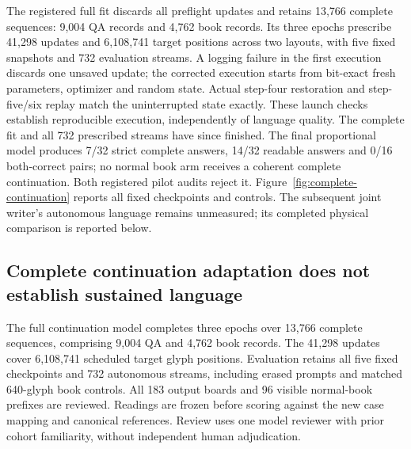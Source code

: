 \documentclass[12pt,a4paper]{article}
\providecommand{\DIFadd}[1]{{\protect\color{blue} \sf #1}} %
\begin{document}
\DIFadd{The registered full fit discards all preflight updates and retains 13,766
complete sequences: 9,004 QA records and 4,762 book records. Its three epochs
prescribe 41,298 updates and 6,108,741 target positions across two layouts,
with five fixed snapshots and 732 evaluation streams. A logging failure in
the first execution discards one unsaved update; the corrected execution starts
from bit-exact fresh parameters, optimizer and random state. Actual step-four
restoration and step-five/six replay match the uninterrupted state exactly.
These launch checks establish reproducible execution, independently of language
quality. The complete fit and all 732 prescribed streams have since finished.
The final proportional model produces 7/32 strict complete answers, 14/32
readable answers and 0/16 both-correct pairs; no normal book arm receives a
coherent complete continuation. Both registered pilot audits reject it.
Figure~\ref{fig:complete-continuation} reports all fixed checkpoints and controls.
The subsequent joint writer's autonomous language remains unmeasured; its
completed physical comparison is reported below.
}


\subsection*{\DIFadd{Complete continuation adaptation does not establish sustained language}}
\DIFadd{The full continuation model completes three epochs over 13,766 complete
sequences, comprising 9,004 QA and 4,762 book records. The 41,298 updates cover
6,108,741 scheduled target glyph positions. Evaluation retains all five fixed
checkpoints and 732 autonomous streams, including erased prompts and matched
640-glyph book controls. All 183 output boards and 96 visible normal-book
prefixes are reviewed. Readings are frozen before scoring against the new
case mapping and canonical references. Review uses one model reviewer with
prior cohort familiarity, without independent human adjudication.
}
\end{document}
